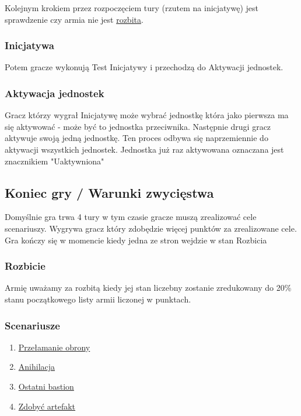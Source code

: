 Kolejnym krokiem przez rozpoczęciem tury (rzutem na inicjatywę) jest sprawdzenie czy armia nie jest \hyperref[sec:link_rozbicie]{rozbita}.

\subsubsection{Inicjatywa}

Potem gracze wykonują Test Inicjatywy i przechodzą do Aktywacji jednostek. 

\subsubsection{Aktywacja jednostek}
Gracz którzy wygrał Inicjatywę może wybrać jednostkę która jako pierwsza ma się aktywować - może być to jednostka przeciwnika. Następnie drugi gracz aktywuje swoją jedną jednostkę. Ten proces odbywa się naprzemiennie do aktywacji wszystkich jednostek. Jednostka już raz aktywowana oznaczana jest znacznikiem "Uaktywniona"

\subsection{Koniec gry / Warunki zwycięstwa}
Domyślnie gra trwa 4 tury w tym czasie gracze muszą zrealizować cele scenariuszy. Wygrywa gracz który zdobędzie więcej punktów za zrealizowane cele.  Gra kończy się w momencie kiedy jedna ze stron wejdzie w stan Rozbicia

\subsubsection{Rozbicie}
\label{sec:link_rozbicie}
Armię uważamy za rozbitą kiedy jej stan liczebny zostanie zredukowany do 20\% stanu początkowego listy armii liczonej w punktach. 

\subsubsection{Scenariusze}

\begin{enumerate}
    \item \hyperref[sec:link_scenariusze_przelamanie_obrony]{Przełamanie obrony}
    \item \hyperref[sec:link_scenariusze_anihilacja]{Anihilacja}
    \item \hyperref[sec:link_scenariusze_ostatni_bastion]{Ostatni bastion}
    \item \hyperref[sec:link_scenariusze_zdobyc_artefakt]{Zdobyć artefakt}
\end{enumerate}

